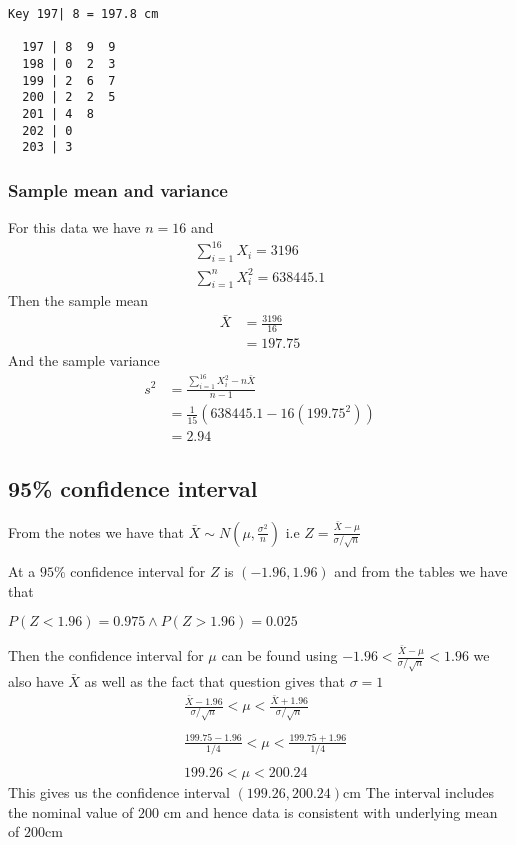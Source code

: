\documentclass[11pt]{article}
\begin{document}
\begin{verbatim}
Key 197| 8 = 197.8 cm

  197 | 8  9  9
  198 | 0  2  3
  199 | 2  6  7
  200 | 2  2  5
  201 | 4  8
  202 | 0
  203 | 3
\end{verbatim}
\subsubsection{Sample mean and variance}
For this data we have $n=16$ and
\begin{align*}
  \sum_{i=1}^{16} X_{i} = 3196 \\
  \sum_{i=1}^{n} X_{i}^{2} = 638445.1
\end{align*}
Then the sample mean
\begin{align*}
  \bar{X} &= \frac{3196}{16} \\
          &= \boxed{197.75}
\end{align*}
And the sample variance
\begin{align*}
  s^{2} &= \frac{\sum_{i=1}^{16}X_{i}^{2}-n\bar{X}}{n-1} \\
        &= \frac{1}{15}(638445.1 -16(199.75^{2})) \\
        &= \boxed{2.94}
\end{align*}
\subsection{95\% confidence interval}
From the notes we have that $\bar{X} \sim N(\mu,\frac{\sigma^{2}}{n})$ i.e $Z = \frac{\bar{X}-\mu}{\sigma/\sqrt{n}}$

At a $95\%$ confidence interval for $Z$ is $(-1.96,1.96)$ and from the tables we have that

$P(Z<1.96)= 0.975 \land P(Z>1.96) = 0.025$

Then the confidence interval for $\mu$ can be found using $-1.96<\frac{\bar{X}-\mu}{\sigma/\sqrt{n}} <1.96$ we also have $\bar{X}$ as well as the fact that question gives that $\sigma=1$
\begin{align*}
  & \frac{\bar{X}-1.96}{\sigma/\sqrt{n}} < \mu < \frac{\bar{X}+1.96}{\sigma/\sqrt{n}} \\ \\
  &\frac{199.75-1.96}{1/4} < \mu < \frac{199.75+1.96}{1/4} \\ \\
  & 199.26 < \mu < 200.24
\end{align*}
This gives us the confidence interval $\boxed{(199.26,200.24)\text{cm}}$ The interval includes the nominal value of $200$ cm and hence data is consistent with underlying mean of $200$cm
\end{document}
